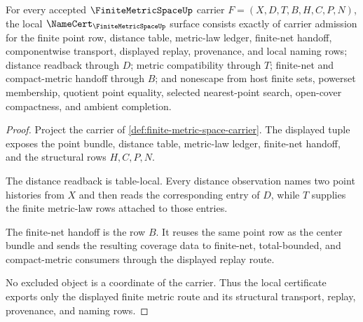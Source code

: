 \begin{theorem}
\label{thm:finite-metric-space-namecert-obligation-surface}
For every accepted $\FiniteMetricSpaceUp$ carrier $F=(X,D,T,B,H,C,P,N)$, the local $\NameCert_{\FiniteMetricSpaceUp}$ surface consists exactly of carrier admission for the finite point row, distance table, metric-law ledger, finite-net handoff, componentwise transport, displayed replay, provenance, and local naming rows; distance readback through $D$; metric compatibility through $T$; finite-net and compact-metric handoff through $B$; and nonescape from host finite sets, powerset membership, quotient point equality, selected nearest-point search, open-cover compactness, and ambient completion.
\end{theorem}
\begin{proof}
Project the carrier of \autoref{def:finite-metric-space-carrier}. The displayed tuple exposes the point bundle, distance table, metric-law ledger, finite-net handoff, and the structural rows $H,C,P,N$.

The distance readback is table-local. Every distance observation names two point histories from $X$ and then reads the corresponding entry of $D$, while $T$ supplies the finite metric-law rows attached to those entries.

The finite-net handoff is the row $B$. It reuses the same point row as the center bundle and sends the resulting coverage data to finite-net, total-bounded, and compact-metric consumers through the displayed replay route.

No excluded object is a coordinate of the carrier. Thus the local certificate exports only the displayed finite metric route and its structural transport, replay, provenance, and naming rows.
\end{proof}

